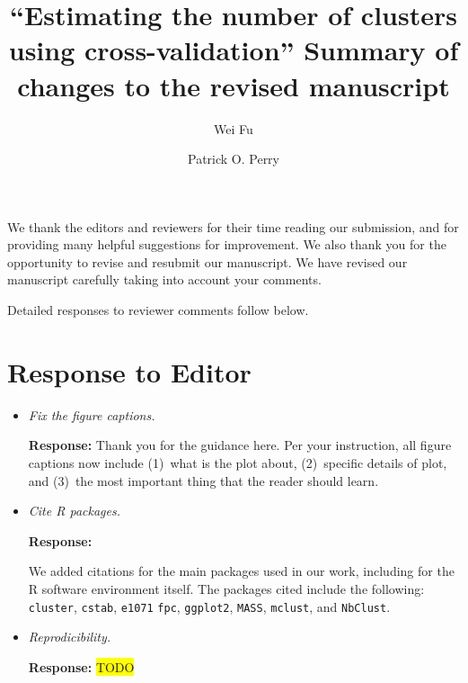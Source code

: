 \documentclass[11pt]{article}
\title{``Estimating the number of clusters using cross-validation''
Summary of changes to the revised manuscript}
\author{Wei Fu \and Patrick O. Perry}
\newcommand{\hilight}[1]{\colorbox{yellow}{#1}}
\newcommand{\todo}{\hilight{TODO}}
\begin{document}
\maketitle
\setlength{\parindent}{0ex}
\setlength{\parskip}{1ex}
\vspace{2ex}

We thank the editors and reviewers for their time reading our submission, and
for providing many helpful suggestions for improvement.  We also thank you for
the opportunity to revise and resubmit our manuscript.  We have revised our
manuscript carefully taking into account your comments.

Detailed responses to reviewer comments follow below.


\section*{Response to Editor}

\begin{itemize}

\item \textit{Fix the figure captions.}

\textbf{Response:} Thank you for the guidance here. Per your instruction, all
figure captions now include (1)~what is the plot about, (2)~specific details
of plot, and (3)~the most important thing that the reader should learn.


\item \textit{Cite R packages.}

\textbf{Response:} 

We added citations for the main packages used in our work, including for the R
software environment itself. The packages cited include the following:
\texttt{cluster},
\texttt{cstab},
\texttt{e1071}
\texttt{fpc},
\texttt{ggplot2},
\texttt{MASS},
\texttt{mclust},
and
\texttt{NbClust}.




\item \textit{Reprodicibility.}

\textbf{Response:} \todo



\end{itemize}
\end{document}

